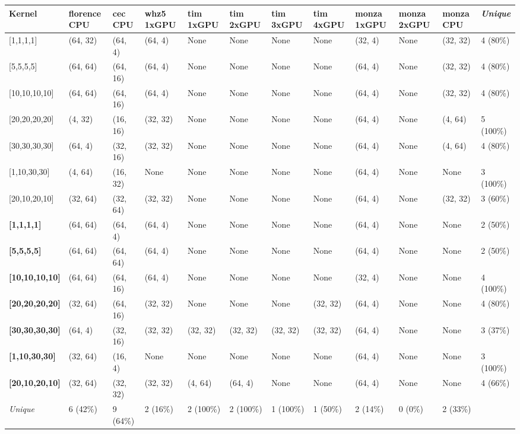 \begin{tabular}{|p{1.8cm} | p{1cm} | p{1cm} | p{1cm} | p{1cm} | p{1cm} | p{1cm} | p{1cm} | p{1cm} | p{1cm} | p{1cm} | p{1.1cm}|}
\hline
\textbf{Kernel} & \textbf{florence CPU} & \textbf{cec CPU} & \textbf{whz5 1xGPU} & \textbf{tim 1xGPU} & \textbf{tim 2xGPU} & \textbf{tim 3xGPU} & \textbf{tim 4xGPU} & \textbf{monza 1xGPU} & \textbf{monza 2xGPU} & \textbf{monza CPU} & \textit{Unique}\\
\hline
{[}1,1,1,1{]} & (64, 32) & (64, 4) & (64, 4) & None & None & None & None & (32, 4) & None & (32, 32) & 4 (80\%)\\
{[}5,5,5,5{]} & (64, 64) & (64, 16) & (64, 4) & None & None & None & None & (64, 4) & None & (32, 32) & 4 (80\%)\\
{[}10,10,10,10{]} & (64, 64) & (64, 16) & (64, 4) & None & None & None & None & (64, 4) & None & (32, 32) & 4 (80\%)\\
{[}20,20,20,20{]} & (4, 32) & (16, 16) & (32, 32) & None & None & None & None & (64, 4) & None & (4, 64) & 5 (100\%)\\
{[}30,30,30,30{]} & (64, 4) & (32, 16) & (32, 32) & None & None & None & None & (64, 4) & None & (4, 64) & 4 (80\%)\\
{[}1,10,30,30{]} & (4, 64) & (16, 32) & None & None & None & None & None & (64, 4) & None & None & 3 (100\%)\\
{[}20,10,20,10{]} & (32, 64) & (32, 64) & (32, 32) & None & None & None & None & (64, 4) & None & (32, 32) & 3 (60\%)\\
\textbf{{[}1,1,1,1{]}} & (64, 64) & (64, 4) & (64, 4) & None & None & None & None & (64, 4) & None & None & 2 (50\%)\\
\textbf{{[}5,5,5,5{]}} & (64, 64) & (64, 64) & (64, 4) & None & None & None & None & (64, 4) & None & None & 2 (50\%)\\
\textbf{{[}10,10,10,10{]}} & (64, 64) & (64, 16) & (64, 4) & None & None & None & None & (32, 4) & None & None & 4 (100\%)\\
\textbf{{[}20,20,20,20{]}} & (32, 64) & (64, 16) & (32, 32) & None & None & None & (32, 32) & (64, 4) & None & None & 4 (80\%)\\
\textbf{{[}30,30,30,30{]}} & (64, 4) & (32, 16) & (32, 32) & (32, 32) & (32, 32) & (32, 32) & (32, 32) & (64, 4) & None & None & 3 (37\%)\\
\textbf{{[}1,10,30,30{]}} & (32, 64) & (16, 4) & None & None & None & None & None & (64, 4) & None & None & 3 (100\%)\\
\textbf{{[}20,10,20,10{]}} & (32, 64) & (32, 32) & (32, 32) & (4, 64) & (64, 4) & None & None & (64, 4) & None & None & 4 (66\%)\\
\hline
\textit{Unique} & 6 (42\%) & 9 (64\%) & 2 (16\%) & 2 (100\%) & 2 (100\%) & 1 (100\%) & 1 (50\%) & 2 (14\%) & 0 (0\%) & 2 (33\%) & \\
\hline
\end{tabular}
